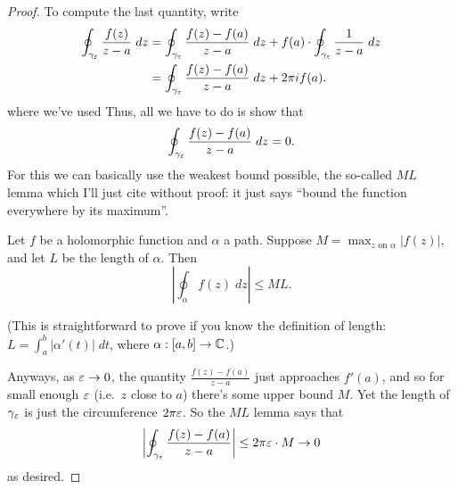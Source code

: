 \begin{proof}
	To compute the last quantity, write
	\begin{align*}
		\oint_{\gamma_\varepsilon} \frac{f(z)}{z-a} \; dz
		&=
		\oint_{\gamma_\varepsilon} \frac{f(z)-f(a)}{z-a} \; dz
		+
		f(a) \cdot \oint_{\gamma_\varepsilon} \frac{1}{z-a} \; dz \\
		&=
		\oint_{\gamma_\varepsilon} \frac{f(z)-f(a)}{z-a} \; dz
		+
		2\pi i f(a).
	\end{align*}
	where we've used 
	Thus, all we have to do is show that 
	\[ \oint_{\gamma_\varepsilon} \frac{f(z)-f(a)}{z-a} \; dz = 0. \]
	For this we can basically use the weakest bound possible, the so-called $ML$ lemma
	which I'll just cite without proof:
	it just says ``bound the function everywhere by its maximum''.
	\begin{lemma}
		Let $f$ be a holomorphic function and $\alpha$ a path.
		Suppose $M = \max_{z \text{ on } \alpha} \left\lvert f(z) \right\rvert$, and
		let $L$ be the length of $\alpha$.
		Then
		\[ \left\lvert \oint_\alpha f(z) \; dz \right\rvert \le ML. \]
	\end{lemma}
	(This is straightforward to prove if you know the definition of length:
	$L = \int_a^b |\alpha'(t)| \; dt$, where $\alpha : [a,b] \to \mathbb C$.)

	Anyways, as $\varepsilon \to 0$, the quantity $\frac{f(z)-f(a)}{z-a}$ just approaches $f'(a)$,
	and so for small enough $\varepsilon$ (i.e.\ $z$ close to $a$) there's some upper bound $M$.
	Yet the length of $\gamma_\varepsilon$ is just the circumference $2\pi \varepsilon$.
	So the $ML$ lemma says that
	\[ \left\lvert \oint_{\gamma_\varepsilon} \frac{f(z)-f(a)}{z-a} \right\rvert
		\le 2\pi\varepsilon \cdot M \to 0
	\]
	as desired.
\end{proof}

